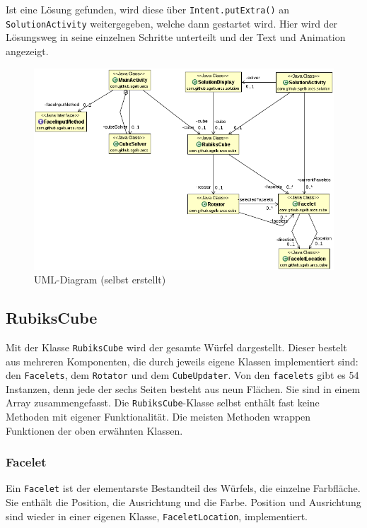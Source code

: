Ist eine Lösung gefunden, wird diese über \texttt{Intent.putExtra()} an
\texttt{SolutionActivity} weitergegeben, welche dann gestartet wird. Hier wird
der Lösungsweg in seine einzelnen Schritte unterteilt und der Text und Animation
angezeigt.

\begin{figure}[ht!]
  \centering
  \includegraphics[width=\textwidth]{pics/uml.png}
  \caption{UML-Diagram (selbst erstellt)}
  \label{fig:uml}
\end{figure}


\subsection{RubiksCube}

Mit der Klasse \texttt{RubiksCube} wird der gesamte Würfel dargestellt. Dieser
bestelt aus mehreren Komponenten, die durch jeweils eigene Klassen implementiert
sind: den \texttt{Facelets}, dem \texttt{Rotator} und dem \texttt{CubeUpdater}.
Von den \texttt{facelets} gibt es 54 Instanzen, denn jede der sechs Seiten besteht
aus neun Flächen. Sie sind in einem Array zusammengefasst. Die
\texttt{RubiksCube}-Klasse selbst enthält fast keine Methoden mit eigener
Funktionalität. Die meisten Methoden wrappen Funktionen der oben erwähnten
Klassen. 

\subsubsection{Facelet}

Ein \texttt{Facelet} ist der elementarste Bestandteil des Würfels, die einzelne
Farbfläche. Sie enthält die Position, die Ausrichtung und die Farbe. Position und
Ausrichtung sind wieder in einer eigenen Klasse, \texttt{FaceletLocation},
implementiert.

